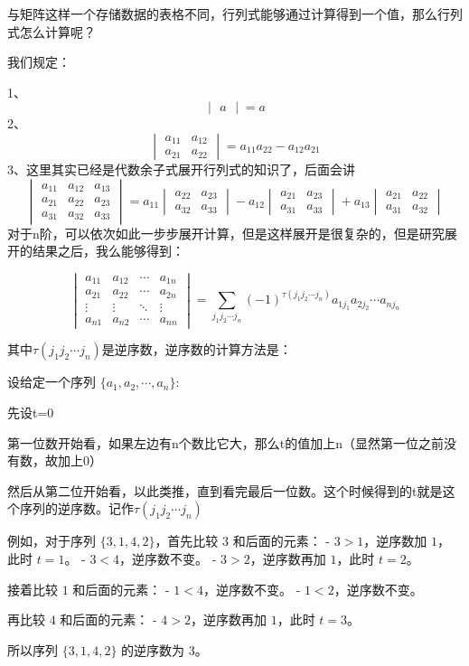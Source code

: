\documentclass[12pt,a4paper]{book}
\begin{document}
\vspace{10pt}

与矩阵这样一个存储数据的表格不同，行列式能够通过计算得到一个值，那么行列式怎么计算呢？

我们规定：

1、
\[
\begin{vmatrix}
a
\end{vmatrix}
=a
\]
2、
\[
\begin{vmatrix}
a_{11}&a_{12}\\
a_{21}&a_{22}
\end{vmatrix}
=a_{11}a_{22}-a_{12}a_{21}
\]
3、这里其实已经是代数余子式展开行列式的知识了，后面会讲
\[
\begin{vmatrix}
a_{11} & a_{12} & a_{13}\\
a_{21} & a_{22} & a_{23}\\
a_{31} & a_{32} & a_{33}
\end{vmatrix}
=
a_{11}
\begin{vmatrix}
a_{22}&a_{23}\\
a_{32}&a_{33}
\end{vmatrix}
-
a_{12}
\begin{vmatrix}
a_{21}&a_{23}\\
a_{31}&a_{33}
\end{vmatrix}
+
a_{13}
\begin{vmatrix}
a_{21}&a_{22}\\
a_{31}&a_{32}
\end{vmatrix}
\]
对于n阶，可以依次如此一步步展开计算，但是这样展开是很复杂的，但是研究展开的结果之后，我么能够得到：

\[
\begin{vmatrix}
a_{11} & a_{12} &\cdots & a_{1n}\\
a_{21} & a_{22} &\cdots & a_{2n}\\
\vdots & \vdots &\ddots & \vdots\\
a_{n1} & a_{n2} &\cdots & a_{nn}
\end{vmatrix}=\sum\limits_{j_1j_2\cdots j_n}(-1)^{\tau(j_1j_2\cdots j_n)}a_{1j_1}a_{2j_2}\cdots a_{nj_n}
\]

其中$\tau(j_1j_2\cdots j_n)$是逆序数，逆序数的计算方法是：

设给定一个序列 $\{a_1,a_2,\cdots,a_n\}$:

先设t=0

第一位数开始看，如果左边有n个数比它大，那么t的值加上n（显然第一位之前没有数，故加上0）

然后从第二位开始看，以此类推，直到看完最后一位数。这个时候得到的t就是这个序列的逆序数。记作$\tau(j_1j_2\cdots j_n)$

\vspace{12pt}
例如，对于序列 $\{3,1,4,2\}$，首先比较 $3$ 和后面的元素：
   - $3 > 1$，逆序数加 $1$，此时 $t = 1$。
   - $3 < 4$，逆序数不变。
   - $3 > 2$，逆序数再加 $1$，此时 $t = 2$。

接着比较 $1$ 和后面的元素：
   - $1 < 4$，逆序数不变。
   - $1 < 2$，逆序数不变。

再比较 $4$ 和后面的元素：
   - $4 > 2$，逆序数再加 $1$，此时 $t = 3$。

所以序列 $\{3,1,4,2\}$ 的逆序数为 $3$。


\end{document}
